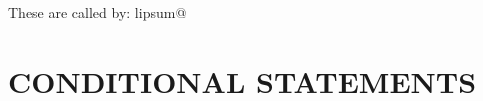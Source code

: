 \begin{teXXX}
\newcommand\lips@default{1-7}

\newcommand\setlipsumdefault[1]{%
  \renewcommand{\lips@default}{#1}}

\newcommand\lips@dolipsum{%
  \ifnum\value{lips@count}<\lips@max\relax%
    \addtocounter{lips@count}{1}%
    \csname lipsum@\roman{lips@count}\endcsname%
    \lips@dolipsum%
  \fi  
}

\newcommand\lipsum[1][\lips@default]{%
  \expandafter\lips@minmax\expandafter{#1}%
  \setcounter{lips@count}{\lips@min}%
  \addtocounter{lips@count}{-1}%
  \lips@dolipsum%
}

\def\lips@get#1-#2;{\def\lips@min{#1}\def\lips@max{#2}}
\def\lips@stripmax#1-{\edef\lips@max{#1}}
\def\lips@minmax#1{%
  \lips@get#1-\relax;%
  \edef\lips@tmpa{\lips@max}%
  \edef\lips@relax{\relax}%
  \ifx\lips@tmpa\lips@relax\edef\lips@max{\lips@min}%
  \else\expandafter\lips@stripmax\lips@max\fi%
}

\newcommand\lipsum@i{Lorem ipsum dolor sit amet, consectetuer
  adipiscing elit. Ut purus elit, vestibulum ut, placerat ac,
  adipiscing vitae, felis.. \par}

These are called by:
 \csname lipsum@\endcsname%

\end{teXXX}



\section*{CONDITIONAL STATEMENTS}

